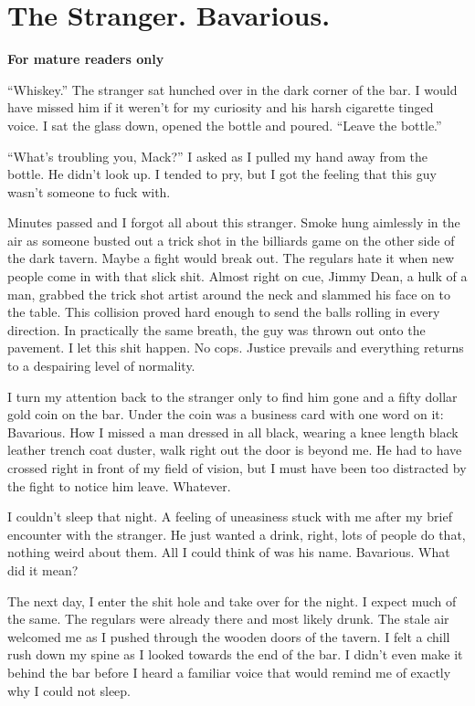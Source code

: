 \chapter{The Stranger. Bavarious. }

{\bf For mature readers only}



``Whiskey.'' The stranger sat hunched over in the dark
corner of the bar. I would have missed him if it weren't for
my curiosity and his harsh cigarette tinged voice. I sat the glass
down, opened the bottle and poured. ``Leave the
bottle.''



``What's troubling you, Mack?'' I asked as I pulled
my hand away from the bottle. He didn't look up. I tended to
pry, but I got the feeling that this guy wasn't someone to
fuck with.



Minutes passed and I forgot all about this stranger. Smoke hung
aimlessly in the air as someone busted out a trick shot in the
billiards game on the other side of the dark tavern. Maybe a fight
would break out. The regulars hate it when new people come in with
that slick shit. Almost right on cue, Jimmy Dean, a hulk of a man,
grabbed the trick shot artist around the neck and slammed his face
on to the table. This collision proved hard enough to send the
balls rolling in every direction. In practically the same breath,
the guy was thrown out onto the pavement. I let this shit happen.
No cops. Justice prevails and everything returns to a despairing
level of normality.



I turn my attention back to the stranger only to find him gone and
a fifty dollar gold coin on the bar. Under the coin was a business
card with one word on it: Bavarious. How I missed a man dressed in
all black, wearing a knee length black leather trench coat duster,
walk right out the door is beyond me. He had to have crossed right
in front of my field of vision, but I must have been too distracted
by the fight to notice him leave. Whatever.



I couldn't sleep that night. A feeling of uneasiness stuck
with me after my brief encounter with the stranger. He just wanted
a drink, right, lots of people do that, nothing weird about them.
All I could think of was his name. Bavarious. What did it
mean?



The next day, I enter the shit hole and take over for the night. I
expect much of the same. The regulars were already there and most
likely drunk. The stale air welcomed me as I pushed through the
wooden doors of the tavern. I felt a chill rush down my spine as I
looked towards the end of the bar. I didn't even make it
behind the bar before I heard a familiar voice that would remind me
of exactly why I could not sleep.



